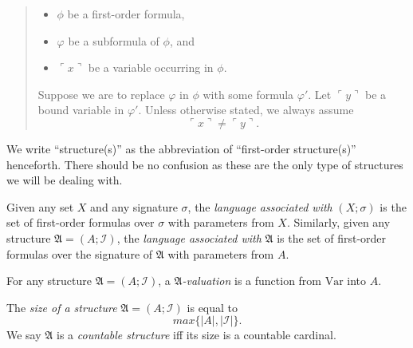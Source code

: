 \documentclass[12pt]{article}
\numberwithin{equation}{section}
\begin{document}
\begin{con}
\begin{enumerate}[label=(\arabic*)]
\begin{quote}
\begin{itemize}
            \item $\phi$ be a first-order formula, 
            \item $\varphi$ be a subformula of $\phi$, and
            \item $\ulcorner x \urcorner$ be a variable occurring in $\phi$.
        \end{itemize}
        Suppose we are to replace $\varphi$ in $\phi$ with some formula $\varphi'$. Let $\ulcorner y \urcorner$ be a bound variable in $\varphi'$. Unless otherwise stated, we always assume $$\ulcorner x \urcorner \neq \ulcorner y \urcorner \text{.}$$        
    \end{quote}
\end{enumerate}
\end{con}

We write ``structure(s)'' as the abbreviation of ``first-order structure(s)'' henceforth. There should be no confusion as these are the only type of structures we will be dealing with.

\begin{defi}
Given any set $X$ and any signature $\sigma$, the \emph{language associated with} $(X; \sigma)$ is the set of first-order formulas over $\sigma$ with parameters from $X$. Similarly, given any structure $\mathfrak{A} = (A; \mathcal{I})$, the \emph{language associated with} $\mathfrak{A}$ is the set of first-order formulas over the signature of $\mathfrak{A}$ with parameters from $A$.
\end{defi}

\begin{defi}
For any structure $\mathfrak{A} = (A; \mathcal{I})$, a $\mathfrak{A}$\emph{-valuation} is a function from $\mathrm{Var}$ into $A$.
\end{defi}

\begin{defi}
The \emph{size of a structure} $\mathfrak{A} = (A; \mathcal{I})$ is equal to $$max\{|A|, |\mathcal{I}|\}.$$ We say $\mathfrak{A}$ is a \emph{countable structure} iff its size is a countable cardinal.
\end{defi}
\end{document}
